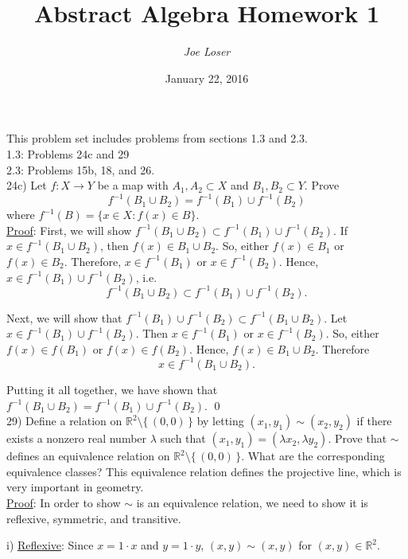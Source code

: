 \documentclass{article}
\title{Abstract Algebra Homework 1}
\author{\textit{Joe Loser}}
\date{January 22, 2016}
\begin{document}
\maketitle

\noindent This problem set includes problems from sections 1.3 and 2.3. \\
1.3: Problems 24c and 29 \\
2.3: Problems 15b, 18, and 26. \\

24c) Let $f: X \to Y$ be a map with $A_1, A_2 \subset X$ and $B_1, B_2 \subset Y.$ Prove
$$ f^{-1} (B_1 \cup B_2)  = f^{-1}(B_1) \cup f^{-1}(B_2)$$
where $f^{-1}(B) = \{ x \in X : f(x) \in B \}.$ \\

\underline{Proof}: First, we will show $f^{-1} (B_1 \cup B_2) \subset f^{-1}(B_1) \cup f^{-1}(B_2).$ If $x \in f^{-1}(B_1 \cup B_2)$, then $f(x) \in B_1 \cup B_2.$ So, either $f(x) \in B_1$ or $f(x) \in B_2.$ Therefore, $x \in f^{-1}(B_1)$ or $x \in f^{-1}(B_2).$  Hence, $x \in f^{-1}(B_1) \cup f^{-1}(B_2)$, i.e. 
$$f^{-1} (B_1 \cup B_2) \subset f^{-1}(B_1) \cup f^{-1}(B_2).$$

Next, we will show that $f^{-1}(B_1) \cup f^{-1}(B_2) \subset f^{-1} (B_1 \cup B_2).$ 
Let $x \in f^{-1}(B_1) \cup f^{-1}(B_2).$ Then $x \in f^{-1}(B_1)$ or $x \in f^{-1}(B_2)$. So, either $f(x) \in f(B_1)$ or $f(x) \in f(B_2).$ Hence, $f(x) \in B_1 \cup B_2.$ Therefore
$$x \in f^{-1}(B_1 \cup B_2).$$ 

Putting it all together, we have shown that $f^{-1} (B_1 \cup B_2) = f^{-1}(B_1) \cup f^{-1}(B_2).$ \qed \\

29) Define a relation on $\mathbb{R}^{2} \setminus \{\,(0,0)\,\} $ by letting $(x_1, y_1) \sim (x_2, y_2)$ if there exists a nonzero real number $\lambda$ such that $(x_1, y_1) = (\lambda x_2, \lambda y_2).$ Prove that $\sim$ defines an equivalence relation on $\mathbb{R}^{2} \setminus \{\,(0,0)\,\}.$ What are the corresponding equivalence classes? This equivalence relation defines the projective line, which is very important in geometry. \\

\underline{Proof}: In order to show $\sim$ is an equivalence relation, we need to show it is reflexive, symmetric, and transitive.

i) \underline{Reflexive}: Since $x = 1 \cdot x$ and $y = 1 \cdot y$, $(x, y) \sim (x, y)$ for $(x, y) \in \mathbb{R}^{2}.$ \\
\end{document}
